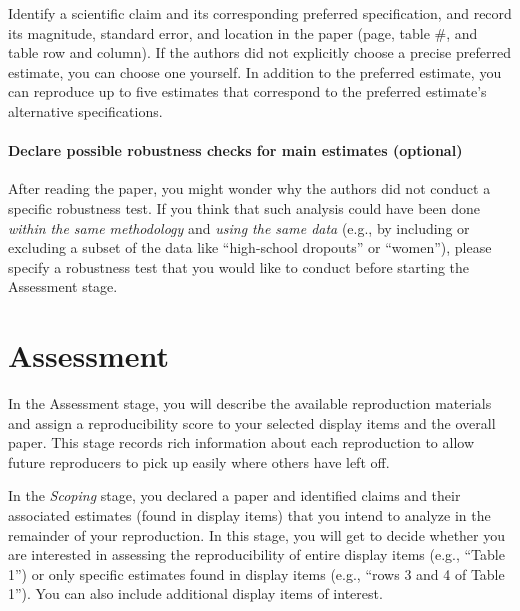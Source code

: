 \documentclass[
]{book}
\begin{document}
Identify a scientific claim and its corresponding preferred specification, and record its magnitude, standard error, and location in the paper (page, table \#, and table row and column). If the authors did not explicitly choose a precise preferred estimate, you can choose one yourself. In addition to the preferred estimate, you can reproduce up to five estimates that correspond to the preferred estimate's alternative specifications.

\hypertarget{declare-possible-robustness-checks-for-main-estimates-optional}{%
\subsubsection*{Declare possible robustness checks for main estimates (optional)}\label{declare-possible-robustness-checks-for-main-estimates-optional}}

After reading the paper, you might wonder why the authors did not conduct a specific robustness test. If you think that such analysis could have been done \emph{within the same methodology} and \emph{using the same data} (e.g., by including or excluding a subset of the data like ``high-school dropouts'' or ``women''), please specify a robustness test that you would like to conduct before starting the Assessment stage.

\hypertarget{assessment}{%
\chapter{Assessment}\label{assessment}}

In the Assessment stage, you will describe the available reproduction materials and assign a reproducibility score to your selected display items and the overall paper. This stage records rich information about each reproduction to allow future reproducers to pick up easily where others have left off.

In the \emph{Scoping} stage, you declared a paper and identified claims and their associated estimates (found in display items) that you intend to analyze in the remainder of your reproduction. In this stage, you will get to decide whether you are interested in assessing the reproducibility of entire display items (e.g., ``Table 1'') or only specific estimates found in display items (e.g., ``rows 3 and 4 of Table 1''). You can also include additional display items of interest.
\end{document}
